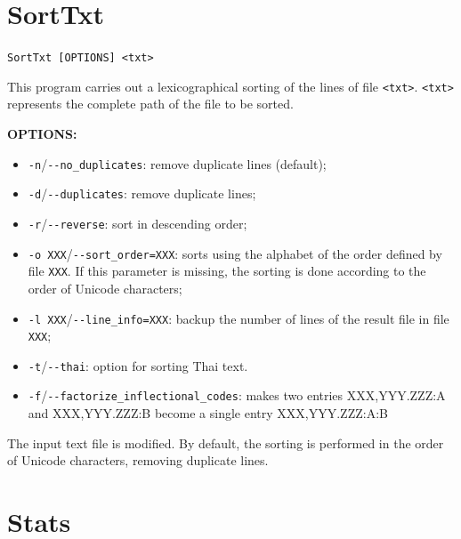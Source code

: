 \section{SortTxt}

\verb+SortTxt [OPTIONS] <txt>+

\bigskip
\noindent This program carries out a lexicographical sorting of the lines of file
\verb+<txt>+. \verb+<txt>+ represents the complete path of the file to be sorted.

\bigskip
\noindent \textbf{OPTIONS:}
\begin{itemize}
  \item \verb+-n+/\verb+--no_duplicates+: remove duplicate lines (default);

  \item \verb+-d+/\verb+--duplicates+: remove duplicate lines;

  \item \verb+-r+/\verb+--reverse+: sort in descending order;

  \item \verb+-o XXX+/\verb+--sort_order=XXX+: sorts using the alphabet of the
  order defined by file \verb+XXX+. If this parameter is missing, the sorting is done according to the
  order of Unicode characters;

  \item \verb+-l XXX+/\verb+--line_info=XXX+: backup the number of lines of the result file in
  file \verb+XXX+;
  
  \item \verb+-t+/\verb+--thai+: option for sorting Thai text.
  \item \verb+-f+/\verb+--factorize_inflectional_codes+: makes two entries XXX,YYY.ZZZ:A and XXX,YYY.ZZZ:B
                                   become a single entry XXX,YYY.ZZZ:A:B
\end{itemize}

\bigskip
\noindent The input text file is modified. By default,
the sorting is performed in the order of Unicode characters, removing duplicate lines.








\section{Stats}

